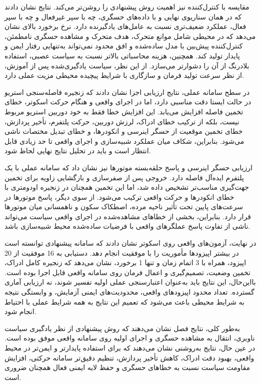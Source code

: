 مقایسه با کنترل‌کننده  نیز اهمیت روش پیشنهادی را روشن‌تر می‌کند. نتایج نشان دادند که  در همان سناریوی نهایی و با داده‌های حسگری، چه با سپر غیرفعال و چه با سپر فعال، عملکرد ضعیف‌تری نسبت به عامل‌های یادگیرنده دارد. نرخ برخورد بالای  نشان می‌دهد که در محیطی شامل موانع متحرک، هدف متحرک و مشاهده حسگری نامطمئن، کنترل‌کننده پیش‌بین با مدل ساده‌شده و افق محدود نمی‌تواند به‌تنهایی رفتار ایمن و پایدار تولید کند. همچنین، هزینه محاسباتی بالاتر  نسبت به سیاست عصبی، استفاده بلادرنگ از آن را دشوارتر می‌سازد. از این نظر، سیاست یادگیری‌شده پس از آموزش، از نظر سرعت تولید فرمان و سازگاری با شرایط پیچیده محیطی مزیت عملی دارد.

در سطح سامانه عملی، نتایج ارزیابی اجزا نشان دادند که زنجیره فاصله‌سنجی استریو در حالت ایستا دقت مناسبی دارد، اما در اجرای واقعی و هنگام حرکت اسکوتر، خطای تخمین فاصله افزایش می‌یابد. این افزایش خطا فقط به خود دوربین استریو مربوط نیست، بلکه از ترکیب خطای ادراک، لرزش دوربین، حرکت پلتفرم، تأخیر پردازش، خطای تخمین موقعیت از حسگر اینرسی و انکودرها، و خطای تبدیل مختصات ناشی می‌شود. بنابراین، شکاف میان عملکرد شبیه‌سازی و اجرای واقعی تا حد زیادی قابل انتظار است و باید در تحلیل نتایج نهایی لحاظ شود.

ارزیابی حسگر اینرسی و پاسخ حلقه‌بسته موتورها نیز نشان داد که سامانه عملی با یک پلتفرم ایده‌آل فاصله دارد. خروجی  پس از صفرسازی و بازگشایی زاویه برای تخمین جهت‌گیری مناسب‌تر تشخیص داده شد، اما این تخمین همچنان در زنجیره اودومتری با خطای انکودرها و حرکت واقعی ترکیب می‌شود. از سوی دیگر، پاسخ موتورها در سرعت‌های پایین تحت تأثیر ناحیه مرده، اصطکاک سکون و ناهمسانی میان موتورها قرار دارد. بنابراین، بخشی از خطاهای مشاهده‌شده در اجرای واقعی سیاست می‌تواند ناشی از تفاوت پاسخ عملگرهای واقعی با فرضیات ساده‌شده محیط شبیه‌سازی باشد.

در نهایت، آزمون‌های واقعی روی اسکوتر نشان دادند که سامانه پیشنهادی توانسته است در بیشتر اپیزودها مأموریت را با موفقیت انجام دهد. دستیابی به 16 موفقیت از 20 اپیزود، همراه با 3 اتمام زمان و تنها 1 برخورد، نشان می‌دهد که زنجیره کامل ادراک، تخمین وضعیت، تصمیم‌گیری و اعمال فرمان روی سامانه واقعی قابل اجرا بوده است. بااین‌حال، این نتایج باید به‌عنوان اعتبارسنجی عملی اولیه تفسیر شوند، نه ارزیابی آماری گسترده. تعداد محدود اپیزودهای واقعی، محدودیت‌های ایمنی آزمایش، و وابستگی نتیجه به شرایط محیطی باعث می‌شود که تعمیم این نتایج به همه شرایط عملی با احتیاط انجام شود.

به‌طور کلی، نتایج فصل نشان می‌دهند که روش پیشنهادی از نظر یادگیری سیاست ناوبری، انتقال به مشاهده حسگری و اجرای اولیه روی سامانه واقعی موفق بوده است. در عین حال، نتایج به‌روشنی نشان می‌دهند که برای استفاده پایدارتر و ایمن‌تر در محیط واقعی، بهبود دقت ادراک، کاهش تأخیر پردازش، تنظیم دقیق‌تر سامانه حرکتی، افزایش مقاومت سیاست نسبت به خطاهای حسگری و حفظ لایه ایمنی فعال همچنان ضروری است.

